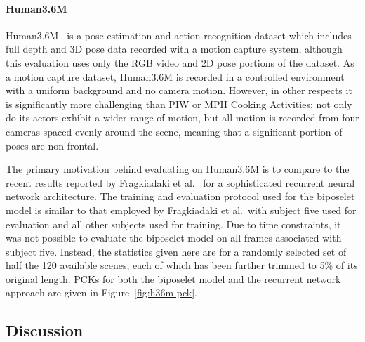 \documentclass[runningheads]{llncs}
\begin{document}
\paragraph{Human3.6M} Human3.6M~\cite{ionescu2014human,ionescu2011latent} is a
pose estimation and action recognition dataset which includes full depth and 3D
pose data recorded with a motion capture system, although this evaluation uses
only the RGB video and 2D pose portions of the dataset. As a motion capture
dataset, Human3.6M is recorded in a controlled environment with a uniform
background and no camera motion. However, in other respects it is significantly
more challenging than PIW or MPII Cooking Activities: not only do its actors
exhibit a wider range of motion, but all motion is recorded from four cameras
spaced evenly around the scene, meaning that a significant portion of poses are
non-frontal.

The primary motivation behind evaluating on Human3.6M is to compare to the
recent results reported by Fragkiadaki et al.~\cite{fragkiadaki2015recurrent}
for a sophisticated recurrent neural network architecture. The training and
evaluation protocol used for the biposelet model is similar to that employed by
Fragkiadaki et al.\, with subject five used for evaluation and all other
subjects used for training. Due to time constraints, it was not possible to
evaluate the biposelet model on all frames associated with subject five.
Instead, the statistics given here are for a randomly selected set of half the
120 available scenes, each of which has been further trimmed to 5\% of its
original length. PCKs for both the biposelet model and the recurrent network
approach are given in Figure~\ref{fig:h36m-pck}.

\subsection{Discussion}\label{sec:discussion}

\end{document}
